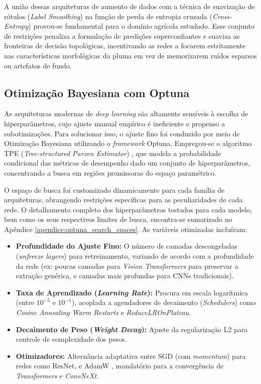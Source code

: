     A união dessas arquiteturas de aumento de dados com a técnica de suavização de rótulos (\textit{Label Smoothing}) \cite{szegedy2016rethinking} na função de perda de entropia cruzada (\textit{Cross-Entropy}) provou-se fundamental para o domínio agrícola estudado. Esse conjunto de restrições penaliza a formulação de predições superconfiantes e suaviza as fronteiras de decisão topológicas, incentivando as redes a focarem estritamente nas características morfológicas da pluma em vez de memorizarem ruídos esparsos ou artefatos de fundo.

\subsection{Otimização Bayesiana com Optuna}

    As arquiteturas modernas de \textit{deep learning} são altamente sensíveis à escolha de hiperparâmetros, cujo ajuste manual empírico é ineficiente e propenso a subotimizações. Para solucionar isso, o ajuste fino foi conduzido por meio de Otimização Bayesiana \cite{shahriari2016taking} utilizando o \textit{framework} Optuna. Empregou-se o algoritmo TPE (\textit{Tree-structured Parzen Estimator}) \cite{bergstra2011algorithms}, que modela a probabilidade condicional das métricas de desempenho dado um conjunto de hiperparâmetros, concentrando a busca em regiões promissoras do espaço paramétrico.

    O espaço de busca foi customizado dinamicamente para cada família de arquiteturas, abrangendo restrições específicas para as peculiaridades de cada rede. O detalhamento completo dos hiperparâmetros testados para cada modelo, bem como os seus respectivos limites de busca, encontra-se sumarizado no Apêndice \ref{apendice:optuna_search_spaces}. As variáveis otimizadas incluíram:
    
    \begin{itemize}
        \item \textbf{Profundidade do Ajuste Fino:} O número de camadas descongeladas (\textit{unfreeze layers}) para retreinamento, variando de acordo com a profundidade da rede (ex: poucas camadas para \textit{Vision Transformers} para preservar a extração genérica, e camadas mais profundas para CNNs tradicionais).
        \item \textbf{Taxa de Aprendizado (\textit{Learning Rate}):} Procura em escala logarítmica (entre $10^{-5}$ e $10^{-1}$), acoplada a agendadores de decaimento (\textit{Schedulers}) como \textit{Cosine Annealing Warm Restarts} \cite{loshchilov2017sgdr} e \textit{ReduceLROnPlateau}.
        \item \textbf{Decaimento de Peso (\textit{Weight Decay}):} Ajuste da regularização L2 para controle de complexidade dos pesos.
        \item \textbf{Otimizadores:} Alternância adaptativa entre SGD (com \textit{momentum}) para redes como ResNet, e AdamW \cite{loshchilov2019decoupled}, mandatório para a convergência de \textit{Transformers} e \textit{ConvNeXt}.
    \end{itemize}

